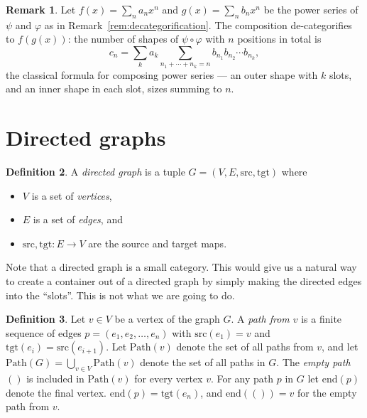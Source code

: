 \documentclass[11pt, a4paper]{article}
\theoremstyle{definition}
\newtheorem{definition}{Definition}[section]
\newtheorem{remark}[definition]{Remark}
\theoremstyle{plain}
\begin{document}
\noindent\colorbox{blue!10}{\parbox{\dimexpr\linewidth-2\fboxsep}{%
\begin{remark}\label{rem:power-series}
Let $f(x) = \sum_n a_n x^n$ and $g(x) = \sum_n b_n x^n$ be the power
series of $\psi$ and $\varphi$ as in
Remark~\ref{rem:decategorification}.  The composition de-categorifies
to $f(g(x))$: the number of shapes of
$\psi \circ \varphi$ with $n$ positions in total is
\[
  c_n = \sum_{k} a_k \sum_{n_1 + \cdots + n_k = n}
  b_{n_1} b_{n_2} \cdots b_{n_k},
\]
the classical formula for composing power series --- an outer shape with
$k$ slots, and an inner shape in each slot, sizes summing to $n$.
\end{remark}%
}}

\section{Directed graphs}

\begin{definition}
A \emph{directed graph} is a tuple $G = (V, E,
\mathrm{src}, \mathrm{tgt})$ where
\begin{itemize}
  \item $V$ is a set of \emph{vertices},
  \item $E$ is a set of \emph{edges}, and
  \item $\mathrm{src}, \mathrm{tgt} : E \to V$ are the source and target maps.
\end{itemize}
\end{definition}

\noindent\colorbox{blue!10}{\parbox{\dimexpr\linewidth-2\fboxsep}{%
Note that a directed graph is a small category.  This would give us a
natural way to create a container out of a directed graph by simply
making the directed edges into the ``slots''.  This is not what we are
going to do.%
}}

\noindent\colorbox{gray!15}{\parbox{\dimexpr\linewidth-2\fboxsep}{%
\begin{definition}\label{def:paths}
Let $v \in V$ be a vertex of the graph $G$.  A \emph{path from $v$} is a finite sequence of edges
$p = (e_1, e_2, \ldots, e_n)$ with $\mathrm{src}(e_1) = v$ and
$\mathrm{tgt}(e_i) = \mathrm{src}(e_{i+1})$.  Let $\mathrm{Path}(v)$ denote
the set of all paths from $v$, and let
$\mathrm{Path}(G) = \bigcup_{v \in V} \mathrm{Path}(v)$ denote the set of
all paths in $G$.  The \emph{empty path}
$()$ is included in $\mathrm{Path}(v)$ for every vertex $v$.
For any path $p$ in $G$ let $\mathrm{end}(p)$ denote the final vertex.
$\mathrm{end}(p) = \mathrm{tgt}(e_n)$, and $\mathrm{end}(()) = v$ for the
empty path from $v$.
\end{definition}%
}}
\end{document}
